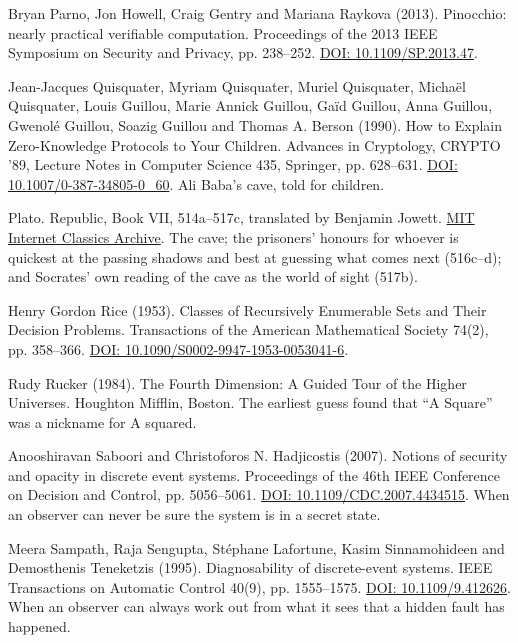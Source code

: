 \noindent Bryan Parno, Jon Howell, Craig Gentry and Mariana Raykova (2013). Pinocchio: nearly practical verifiable computation. Proceedings of the 2013 IEEE Symposium on Security and Privacy, pp. 238--252. \href{https://doi.org/10.1109/SP.2013.47}{DOI: 10.1109/SP.2013.47}.
\par\medskip

\noindent Jean-Jacques Quisquater, Myriam Quisquater, Muriel Quisquater, Micha\"el Quisquater, Louis Guillou, Marie Annick Guillou, Ga\"id Guillou, Anna Guillou, Gwenol\'e Guillou, Soazig Guillou and Thomas A. Berson (1990). How to Explain Zero-Knowledge Protocols to Your Children. Advances in Cryptology, CRYPTO '89, Lecture Notes in Computer Science 435, Springer, pp. 628--631. \href{https://doi.org/10.1007/0-387-34805-0_60}{DOI: 10.1007/0-387-34805-0\_60}. Ali Baba's cave, told for children.
\par\medskip

\noindent Plato. Republic, Book VII, 514a--517c, translated by Benjamin Jowett. \href{https://classics.mit.edu/Plato/republic.8.vii.html}{MIT Internet Classics Archive}. The cave; the prisoners' honours for whoever is quickest at the passing shadows and best at guessing what comes next (516c--d); and Socrates' own reading of the cave as the world of sight (517b).
\par\medskip

\noindent Henry Gordon Rice (1953). Classes of Recursively Enumerable Sets and Their Decision Problems. Transactions of the American Mathematical Society 74(2), pp. 358--366. \href{https://doi.org/10.1090/S0002-9947-1953-0053041-6}{DOI: 10.1090/S0002-9947-1953-0053041-6}.
\par\medskip

\noindent Rudy Rucker (1984). The Fourth Dimension: A Guided Tour of the Higher Universes. Houghton Mifflin, Boston. The earliest guess found that ``A Square'' was a nickname for A squared.
\par\medskip

\noindent Anooshiravan Saboori and Christoforos N. Hadjicostis (2007). Notions of security and opacity in discrete event systems. Proceedings of the 46th IEEE Conference on Decision and Control, pp. 5056--5061. \href{https://doi.org/10.1109/CDC.2007.4434515}{DOI: 10.1109/CDC.2007.4434515}. When an observer can never be sure the system is in a secret state.
\par\medskip

\noindent Meera Sampath, Raja Sengupta, St\'ephane Lafortune, Kasim Sinnamohideen and Demosthenis Teneketzis (1995). Diagnosability of discrete-event systems. IEEE Transactions on Automatic Control 40(9), pp. 1555--1575. \href{https://doi.org/10.1109/9.412626}{DOI: 10.1109/9.412626}. When an observer can always work out from what it sees that a hidden fault has happened.
\par\medskip

